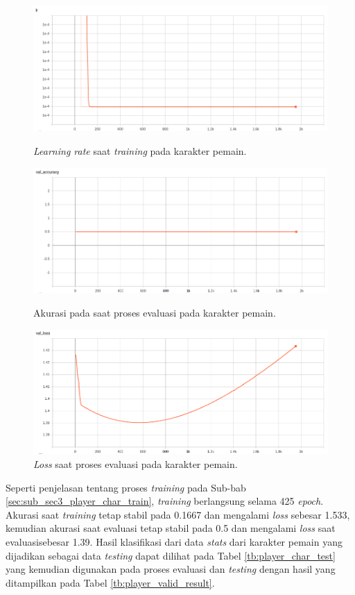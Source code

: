 \begin{figure} [!h] \centering
	\includegraphics[scale=0.44]{img/player_lr_chap4.png}
	\caption{\textit{Learning rate} saat \textit{training} pada karakter pemain.}
	\label{fig:nn_player_lr_chap4}
	\vspace{4ex}
	
	\includegraphics[scale=0.44]{img/player_val_acc_chap4.png}
	\caption{Akurasi pada saat proses evaluasi pada karakter pemain.}
	\label{fig:nn_player_val_acc_chap4}
	\vspace{4ex}
	
	\includegraphics[scale=0.44]{img/player_val_loss_chap4.png}
	\caption{\textit{Loss} saat proses evaluasi pada karakter pemain.}
	\label{fig:nn_player_val_loss_chap4}
\end{figure}
\clearpage

Seperti penjelasan tentang proses \textit{training} pada Sub-bab \ref{sec:sub_sec3_player_char_train}, \textit{training} berlangsung selama 425 \textit{epoch}. Akurasi saat \textit{training} tetap stabil pada 0.1667 dan mengalami \textit{loss} sebesar 1.533, kemudian akurasi saat evaluasi tetap stabil pada 0.5 dan mengalami \textit{loss} saat evaluasisebesar 1.39. Hasil klasifikasi dari data \textit{stats} dari karakter pemain yang dijadikan sebagai data \textit{testing} dapat dilihat pada Tabel \ref{tb:player_char_test} yang kemudian digunakan pada proses evaluasi dan \textit{testing} dengan hasil yang ditampilkan pada Tabel \ref{tb:player_valid_result}.
\vspace{-1ex}

